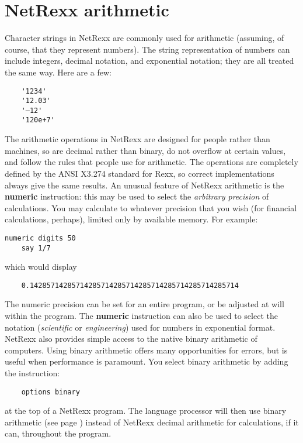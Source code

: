 \section{NetRexx arithmetic}
Character strings in NetRexx are commonly used for arithmetic
(assuming, of course, that they represent numbers). The string
representation of numbers can include integers, decimal notation,
and exponential notation; they are all treated the same way. Here are
a few:
\begin{verbatim}
    '1234'
    '12.03'
    '–12'
    '120e+7'
\end{verbatim}
The arithmetic operations in NetRexx are designed for people rather than machines, so are decimal rather than binary, do not overflow at certain values, and follow the rules that people use for arithmetic. The operations are completely defined by the ANSI X3.274 standard for Rexx, so correct implementations always give the same results.
An unusual feature of NetRexx arithmetic is the \textbf{numeric} instruction:
this may be used to select the \emph{arbitrary precision} of
calculations. You may calculate to whatever precision that you wish
(for financial calculations, perhaps), limited only by available
memory. For example:
\begin{lstlisting}[label=Digits,caption=Digits]
    numeric digits 50
    say 1/7
\end{lstlisting}
which would display
\begin{verbatim}
    0.14285714285714285714285714285714285714285714285714
\end{verbatim}
The numeric precision can be set for an entire program, or be adjusted at will within the program. The \textbf{numeric} instruction can also be used to select the notation (\emph{scientific} or \emph{engineering}) used for numbers in exponential format.
NetRexx also provides simple access to the native binary arithmetic of
computers. Using binary arithmetic offers many opportunities for
errors, but is useful when performance is paramount. You select binary
arithmetic by adding the instruction:
\begin{verbatim}
    options binary
\end{verbatim}
at the top of a NetRexx program. The language processor will then use
binary arithmetic (see page \pageref{binarith}) instead of NetRexx decimal arithmetic for calculations, if it can, throughout the program.
